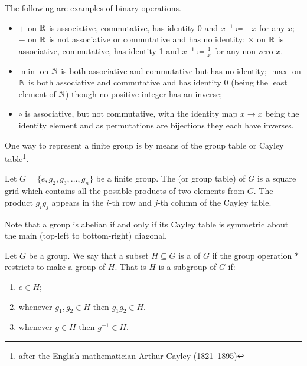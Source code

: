 \begin{example}
The following are examples of binary operations.
\begin{itemize}
\item $+$ on $\mathbb R$ is associative, commutative, has identity 0 and $x^{-1} \coloneqq -x$ for any $x$; $-$ on $\mathbb R$ is not associative or commutative and has no identity; $\times$ on $\mathbb R$ is associative, commutative, has identity 1 and $x^{-1} \coloneqq \frac{1}{x}$ for any non-zero $x$.
\item $\min$ on $\mathbb N$ is both associative and commutative but has no identity; $\max$ on $\mathbb N$ is both associative and commutative and has identity $0$ (being the least element of $\mathbb N$) though no positive integer has an inverse;
\item $\circ$ is associative, but not commutative, with the identity map $x \to x$ being the identity element and as permutations are bijections they each have inverses.
\end{itemize}
\end{example}
\pagebreak




One way to represent a finite group is by means of the group table or Cayley table\footnote{after the English mathematician Arthur Cayley (1821--1895)}.

\begin{definition}
Let $G=\{e,g_2,g_3,\dots,g_n\}$ be a finite group. The  (or group table) of $G$ is a square grid which contains all the possible products of two elements from $G$. The product $g_ig_j$ appears in the $i$-th row and $j$-th column of the Cayley table.
\end{definition}

\begin{remark}
Note that a group is abelian if and only if its Cayley table is symmetric about the main (top-left to bottom-right) diagonal.
\end{remark}

\begin{definition}[Subgroup]
Let $G$ be a group. We say that a subset $H \subseteq G$ is a  of $G$ if the group operation $\ast$ restricts to make a group of $H$. That is $H$ is a subgroup of $G$ if:
\begin{enumerate}[label=(\roman*)]
\item $e \in H$;
\item whenever $g_1,g_2\in H$ then $g_1g_2 \in H$.
\item whenever $g \in H$ then $g^{-1} \in H$.
\end{enumerate}
\end{definition}

